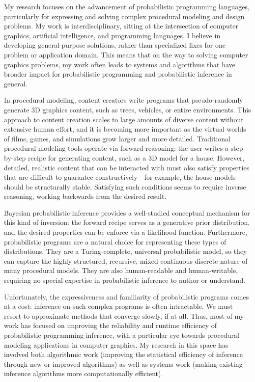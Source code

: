 \documentclass[
11pt, %
a4paper, %
oneside, %
headinclude,footinclude, %
BCOR5mm, %
]{scrartcl}
\title{\normalfont\spacedallcaps{Daniel Ritchie}} %
\author{\spacedallcaps{Research Statement}} %
\date{} %
\begin{document}
\maketitle

My research focuses on the advancement of probabilistic programming languages, particularly for expressing and solving complex procedural modeling and design problems. My work is interdisciplinary, sitting at the intersection of computer graphics, artificial intelligence, and programming languages. I believe in developing general-purpose solutions, rather than specialized fixes for one problem or application domain. This means that on the way to solving computer graphics problems, my work often leads to systems and algorithms that have broader impact for probabilistic programming and probabilistic inference in general.

In procedural modeling, content creators write programs that pseudo-randomly generate 3D graphics content, such as trees, vehicles, or entire environments. This approach to content creation scales to large amounts of diverse content without extensive human effort, and it is becoming more important as the virtual worlds of films, games, and simulations grow larger and more detailed. Traditional procedural modeling tools operate via forward reasoning: the user writes a step-by-step recipe for generating content, such as a 3D model for a house. However, detailed, realistic content that can be interacted with must also satisfy properties that are difficult to guarantee constructively—for example, the house models should be structurally stable. Satisfying such conditions seems to require inverse reasoning, working backwards from the desired result.

Bayesian probabilistic inference provides a well-studied conceptual mechanism for this kind of inversion: the forward recipe serves as a generative prior distribution, and the desired properties can be enforce via a likelihood function. Furthermore, probabilistic programs are a natural choice for representing these types of distributions. They are a Turing-complete, universal probabilistic model, so they can capture the highly structured, recursive, mixed-continuous-discrete nature of many procedural models. They are also human-readable and human-writable, requiring no special expertise in probabilistic inference to author or understand.

Unfortunately, the expressiveness and familiarity of probabilistic programs comes at a cost: inference on such complex programs is often intractable. We must resort to approximate methods that converge slowly, if at all. Thus, most of my work has focused on improving the reliability and runtime efficiency of probabilistic programming inference, with a particular eye towards procedural modeling applications in computer graphics. My research in this space has involved both algorithmic work (improving the statistical efficiency of inference through new or improved algorithms) as well as systems work (making existing inference algorithms more computationally efficient).
\end{document}
